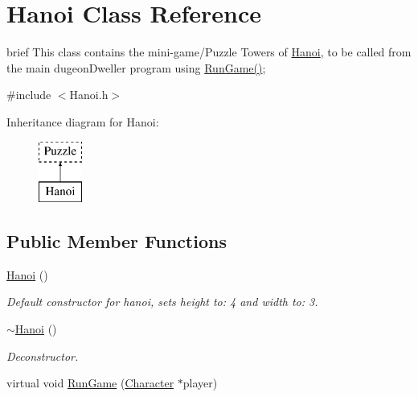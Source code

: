 \hypertarget{classHanoi}{\section{Hanoi Class Reference}
\label{classHanoi}
}


brief This class contains the mini-\/game/\-Puzzle Towers of \hyperlink{classHanoi}{Hanoi}, to be called from the main dugeon\-Dweller program using \hyperlink{classHanoi_a294a2a533b7f3305391aa880f7a0eb36}{Run\-Game()};  




{\ttfamily \#include $<$Hanoi.\-h$>$}

Inheritance diagram for Hanoi\-:\begin{figure}[H]
\begin{center}
\leavevmode
\includegraphics[height=2.000000cm]{classHanoi}
\end{center}
\end{figure}
\subsection*{Public Member Functions}
\begin{DoxyCompactItemize}
\item 
\hyperlink{classHanoi_a2af453ec21277f20edc002be08f22346}{Hanoi} ()
\begin{DoxyCompactList}\small\item\em Default constructor for hanoi, sets height to\-: 4 and width to\-: 3. \end{DoxyCompactList}\item 
\hyperlink{classHanoi_a59760291bfeda65330ff53c429a4e55b}{$\sim$\-Hanoi} ()
\begin{DoxyCompactList}\small\item\em Deconstructor. \end{DoxyCompactList}\item 
virtual void \hyperlink{classHanoi_a294a2a533b7f3305391aa880f7a0eb36}{Run\-Game} (\hyperlink{classCharacter}{Character} $\ast$player)
\end{DoxyCompactItemize}
